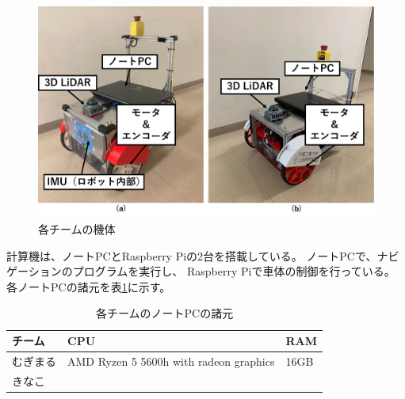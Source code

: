 \documentclass[twocolumn,9pt]{jsproceedings}
\begin{document}
 \begin{figure}[htbp]
   \begin{center}
     \includegraphics[width=1.0\linewidth]{figs/robot.eps}
     \caption{各チームの機体}
     \label{fig:robot}
   \end{center}
 \end{figure}


計算機は、ノートPCとRaspberry Piの2台を搭載している。
ノートPCで、ナビゲーションのプログラムを実行し、
Raspberry Piで車体の制御を行っている。
各ノートPCの諸元を表\ref{table:laptop}に示す。

\begin{table}[H]
  \centering
  \caption{各チームのノートPCの諸元}
  \label{table:laptop}
	  \begin{tabular}{|l|p{5.0cm}|l|}
    \hline
    チーム   & CPU & RAM\\ 
    \hline
    むぎまる & AMD Ryzen 5 5600h with radeon graphics & 16GB \\
    \hline
    きなこ  & & \\
    \hline
  \end{tabular}
\end{table}
\end{document}
